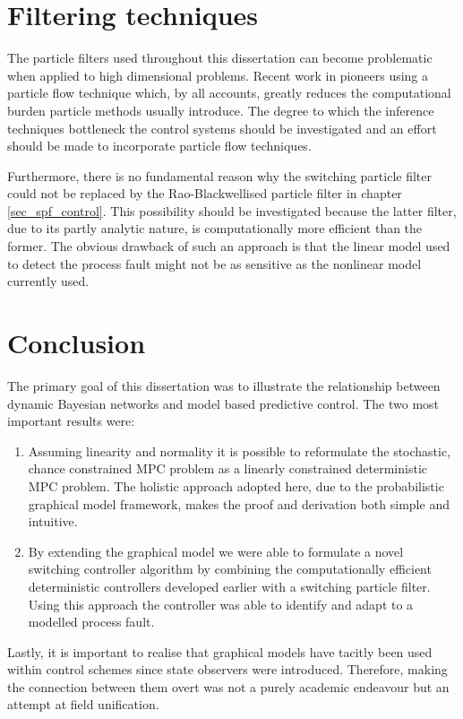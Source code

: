 \section{Filtering techniques}
The particle filters used throughout this dissertation can become problematic when applied to high dimensional problems. Recent work in \cite{daum} pioneers using a particle flow technique which, by all accounts, greatly reduces the computational burden particle methods usually introduce. The degree to which the inference techniques bottleneck the control systems should be investigated and an effort should be made to incorporate particle flow techniques. 

Furthermore, there is no fundamental reason why the switching particle filter could not be replaced by the Rao-Blackwellised particle filter in chapter \ref{sec_spf_control}. This possibility should be investigated because the latter filter, due to its partly analytic nature, is computationally more efficient than the former. The obvious drawback of such an approach is that the linear model used to detect the process fault might not be as sensitive as the nonlinear model currently used.

\section{Conclusion}
The primary goal of this dissertation was to illustrate the relationship between dynamic Bayesian networks and model based predictive control. The two most important results were:
\begin{enumerate}
\item
Assuming linearity and normality it is possible to reformulate the stochastic, chance constrained MPC problem as a linearly constrained deterministic MPC problem. The holistic approach adopted here, due to the probabilistic graphical model framework, makes the proof and derivation both simple and intuitive.
\item
By extending the graphical model we were able to formulate a novel switching controller algorithm by combining the computationally efficient deterministic controllers developed earlier with a switching particle filter. Using this approach the controller was able to identify and adapt to a modelled process fault.
\end{enumerate} 
Lastly, it is important to realise that graphical models have tacitly been used within control schemes since state observers were introduced. Therefore, making the connection between them overt was not a purely academic endeavour but an attempt at field unification.